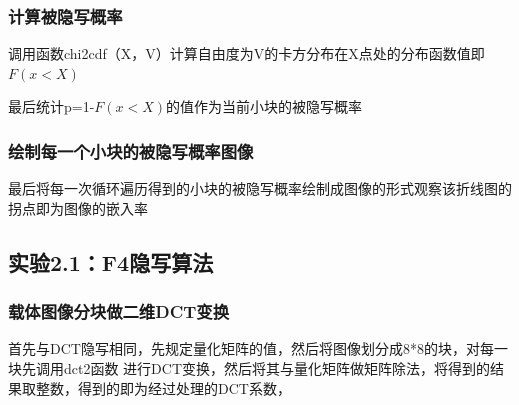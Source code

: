 \documentclass[a4paper,11pt,UTF8]{ctexart}
\begin{document}
      \subsubsection{计算被隐写概率}
        调用函数chi2cdf（X，V）计算自由度为V的卡方分布在X点处的分布函数值即$F\left ( x<X \right ) $\par
        最后统计p=1-$F\left ( x<X \right ) $的值作为当前小块的被隐写概率
      \subsubsection{绘制每一个小块的被隐写概率图像}
        最后将每一次循环遍历得到的小块的被隐写概率绘制成图像的形式观察该折线图的拐点即为图像的嵌入率

    \subsection{实验2.1：F4隐写算法}
      \subsubsection{载体图像分块做二维DCT变换}
        首先与DCT隐写相同，先规定量化矩阵的值，然后将图像划分成8*8的块，对每一块先调用dct2函数
        进行DCT变换，然后将其与量化矩阵做矩阵除法，将得到的结果取整数，得到的即为经过处理的DCT系数，
\end{document}
